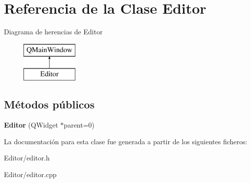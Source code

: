 \hypertarget{class_editor}{\section{Referencia de la Clase Editor}
\label{class_editor}
}
Diagrama de herencias de Editor\begin{figure}[H]
\begin{center}
\leavevmode
\includegraphics[height=2.000000cm]{class_editor}
\end{center}
\end{figure}
\subsection*{Métodos públicos}
\begin{DoxyCompactItemize}
\item 
\hypertarget{class_editor_a2918aceeffbc123a96e201b0934b9b16}{{\bfseries Editor} (Q\-Widget $\ast$parent=0)}\label{class_editor_a2918aceeffbc123a96e201b0934b9b16}

\end{DoxyCompactItemize}


La documentación para esta clase fue generada a partir de los siguientes ficheros\-:\begin{DoxyCompactItemize}
\item 
Editor/editor.\-h\item 
Editor/editor.\-cpp\end{DoxyCompactItemize}
